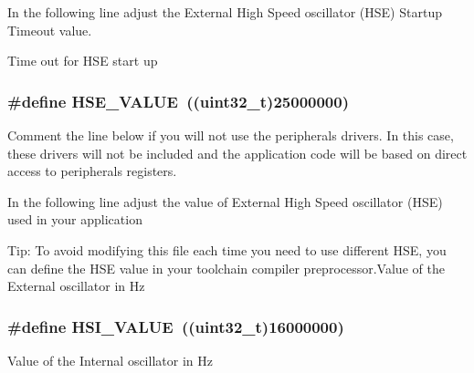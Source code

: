 In the following line adjust the External High Speed oscillator (H\+SE) Startup Timeout value. 

Time out for H\+SE start up 
\subsubsection[{\texorpdfstring{H\+S\+E\+\_\+\+V\+A\+L\+UE}{HSE_VALUE}}]{\setlength{\rightskip}{0pt plus 5cm}\#define H\+S\+E\+\_\+\+V\+A\+L\+UE~((uint32\+\_\+t)25000000)}\hypertarget{group___library__configuration__section_gaeafcff4f57440c60e64812dddd13e7cb}{}\label{group___library__configuration__section_gaeafcff4f57440c60e64812dddd13e7cb}


Comment the line below if you will not use the peripherals drivers. In this case, these drivers will not be included and the application code will be based on direct access to peripherals registers. 

In the following line adjust the value of External High Speed oscillator (H\+SE) used in your application

Tip\+: To avoid modifying this file each time you need to use different H\+SE, you can define the H\+SE value in your toolchain compiler preprocessor.\+Value of the External oscillator in Hz 
\subsubsection[{\texorpdfstring{H\+S\+I\+\_\+\+V\+A\+L\+UE}{HSI_VALUE}}]{\setlength{\rightskip}{0pt plus 5cm}\#define H\+S\+I\+\_\+\+V\+A\+L\+UE~((uint32\+\_\+t)16000000)}\hypertarget{group___library__configuration__section_gaaa8c76e274d0f6dd2cefb5d0b17fbc37}{}\label{group___library__configuration__section_gaaa8c76e274d0f6dd2cefb5d0b17fbc37}
Value of the Internal oscillator in Hz 